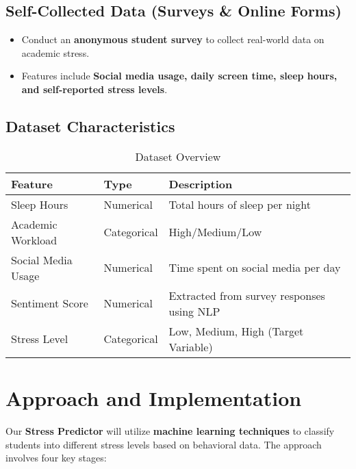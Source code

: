 \documentclass[a4paper,11pt]{article}
\begin{document}
\subsection{Self-Collected Data (Surveys \& Online Forms)}
\begin{itemize}
    \item Conduct an \textbf{anonymous student survey} to collect real-world data on academic stress.
    \item Features include \textbf{Social media usage, daily screen time, sleep hours, and self-reported stress levels}.
\end{itemize}

\subsection{Dataset Characteristics}
\begin{center}
\begin{table}[h]
    \centering
    \begin{tabular}{|l|l|p{8cm}|}
        \hline
        \textbf{Feature} & \textbf{Type} & \textbf{Description} \\ \hline
        Sleep Hours & Numerical & Total hours of sleep per night \\ \hline
        Academic Workload & Categorical & High/Medium/Low \\ \hline
        Social Media Usage & Numerical & Time spent on social media per day \\ \hline
        Sentiment Score & Numerical & Extracted from survey responses using NLP \\ \hline
        Stress Level & Categorical & Low, Medium, High (Target Variable) \\ \hline

    \end{tabular}
    \caption{Dataset Overview}
\end{table}
\end{center}

\vspace{0.5cm}


\section{Approach and Implementation}

Our \textbf{Stress Predictor} will utilize \textbf{machine learning techniques} to classify students into different stress levels based on behavioral data. The approach involves four key stages:
\end{document}
